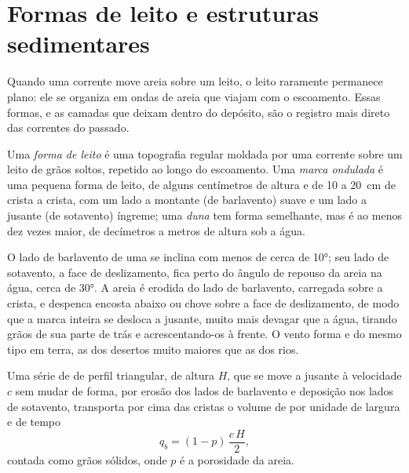 \section{Formas de leito e estruturas sedimentares}\label{sec:b1:clastic-sediments:bedforms}

Quando uma corrente move areia sobre um leito, o leito raramente permanece plano: ele se organiza em ondas de areia que viajam com o escoamento. Essas formas, e as camadas que deixam dentro do depósito, são o registro mais direto das correntes do passado.

\begin{definition}\label{def:b1:clastic-sediments:bedform}
Uma \emph{forma de leito} é uma topografia regular moldada por uma corrente sobre um leito de grãos soltos, repetido ao longo do escoamento. Uma \emph{marca ondulada} é uma pequena forma de leito, de alguns centímetros de altura e de 10 a \qty{20}{cm} de crista a crista, com um lado a montante (de barlavento) suave e um lado a jusante (de sotavento) íngreme; uma \emph{duna} tem forma semelhante, mas é ao menos dez vezes maior, de decímetros a metros de altura sob a água.
\end{definition}

O lado de barlavento de uma  se inclina com menos de cerca de \ang{10}; seu lado de sotavento, a face de deslizamento, fica perto do ângulo de repouso da areia na água, cerca de \ang{30}. A areia é erodida do lado de barlavento, carregada sobre a crista, e despenca encosta abaixo ou chove sobre a face de deslizamento, de modo que a marca inteira se desloca a jusante, muito mais devagar que a água, tirando grãos de sua parte de trás e acrescentando-os à frente. O vento forma  e  do mesmo tipo em terra, as  dos desertos muito maiores que as dos rios.

\begin{proposition}\label{prop:b1:clastic-sediments:migration}
Uma série de  de perfil triangular, de altura $H$, que se move a jusante à velocidade $c$ sem mudar de forma, por erosão dos lados de barlavento e deposição nos lados de sotavento, transporta por cima das cristas o volume de  por unidade de largura e de tempo
\[
  q_b = (1 - p)\,\frac{c\,H}{2},
\]
contada como grãos sólidos, onde $p$ é a porosidade da areia.
\end{proposition}

